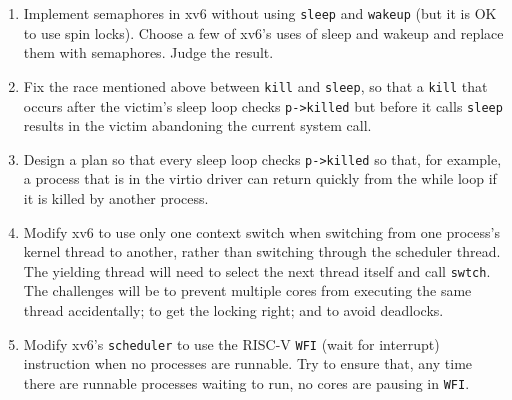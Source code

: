 \begin{enumerate}

\item Implement semaphores in xv6 without using
\lstinline{sleep} and \lstinline{wakeup} (but it
is OK to use spin locks).
Choose a few of xv6's uses of sleep and wakeup and
replace them with semaphores.
Judge the result.

\item Fix the race mentioned above between
\lstinline{kill}
and 
\lstinline{sleep},
so that a
\lstinline{kill}
that occurs after the victim's sleep loop checks
\lstinline{p->killed}
but before it calls
\lstinline{sleep}
results in the victim abandoning the current system call.

\item Design a plan so that every sleep loop checks 
\lstinline{p->killed}
so that, for example, a process that is in the virtio driver can return quickly from the while loop
if it is killed by another process.

\item Modify xv6 to use only one context switch when switching from
  one process's kernel thread to another, rather than switching
  through the scheduler thread. The yielding thread will need to select
  the next thread itself and call \texttt{swtch}. The challenges will
  be to prevent multiple cores from executing the same thread accidentally;
  to get the locking right; and to avoid deadlocks.

\item Modify xv6's
\lstinline{scheduler}
to use the
RISC-V
\lstinline{WFI}
(wait for interrupt)
instruction
when no processes are runnable.
Try to ensure that, any time there are runnable processes waiting
to run, no cores are pausing in \texttt{WFI}.

\end{enumerate}
